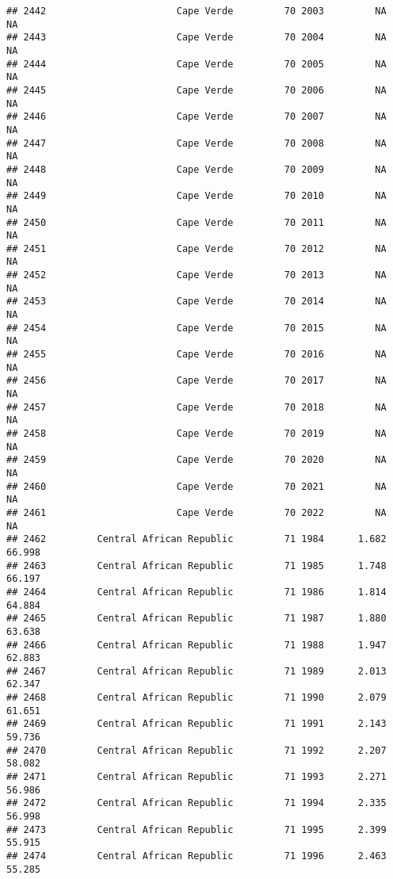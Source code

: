 \documentclass[
]{article}
\begin{document}
\begin{verbatim}
## 2442                       Cape Verde         70 2003         NA         NA
## 2443                       Cape Verde         70 2004         NA         NA
## 2444                       Cape Verde         70 2005         NA         NA
## 2445                       Cape Verde         70 2006         NA         NA
## 2446                       Cape Verde         70 2007         NA         NA
## 2447                       Cape Verde         70 2008         NA         NA
## 2448                       Cape Verde         70 2009         NA         NA
## 2449                       Cape Verde         70 2010         NA         NA
## 2450                       Cape Verde         70 2011         NA         NA
## 2451                       Cape Verde         70 2012         NA         NA
## 2452                       Cape Verde         70 2013         NA         NA
## 2453                       Cape Verde         70 2014         NA         NA
## 2454                       Cape Verde         70 2015         NA         NA
## 2455                       Cape Verde         70 2016         NA         NA
## 2456                       Cape Verde         70 2017         NA         NA
## 2457                       Cape Verde         70 2018         NA         NA
## 2458                       Cape Verde         70 2019         NA         NA
## 2459                       Cape Verde         70 2020         NA         NA
## 2460                       Cape Verde         70 2021         NA         NA
## 2461                       Cape Verde         70 2022         NA         NA
## 2462         Central African Republic         71 1984      1.682     66.998
## 2463         Central African Republic         71 1985      1.748     66.197
## 2464         Central African Republic         71 1986      1.814     64.884
## 2465         Central African Republic         71 1987      1.880     63.638
## 2466         Central African Republic         71 1988      1.947     62.883
## 2467         Central African Republic         71 1989      2.013     62.347
## 2468         Central African Republic         71 1990      2.079     61.651
## 2469         Central African Republic         71 1991      2.143     59.736
## 2470         Central African Republic         71 1992      2.207     58.082
## 2471         Central African Republic         71 1993      2.271     56.986
## 2472         Central African Republic         71 1994      2.335     56.998
## 2473         Central African Republic         71 1995      2.399     55.915
## 2474         Central African Republic         71 1996      2.463     55.285

\end{verbatim}
\end{document}
